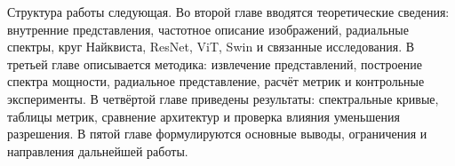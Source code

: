 Структура работы следующая. Во второй главе вводятся теоретические сведения: внутренние представления, частотное описание изображений, радиальные спектры, круг Найквиста, ResNet, ViT, Swin и связанные исследования. В третьей главе описывается методика: извлечение представлений, построение спектра мощности, радиальное представление, расчёт метрик и контрольные эксперименты. В четвёртой главе приведены результаты: спектральные кривые, таблицы метрик, сравнение архитектур и проверка влияния уменьшения разрешения. В пятой главе формулируются основные выводы, ограничения и направления дальнейшей работы.
